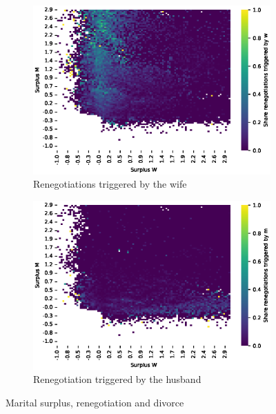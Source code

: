 \documentclass[]{article}
\begin{document}
\begin{figure}[H]
\begin{subfigure}{0.49\textwidth}
		\includegraphics[width=\textwidth]{surp_renw.eps} %
		\caption{Renegotiations triggered by the wife}
		\label{fig:picture3}
	\end{subfigure}
	\begin{subfigure}{0.49\textwidth}
		\centering
		\includegraphics[width=\textwidth]{surp_renm.eps} %
		\caption{Renegotiation triggered by the husband}
		\label{fig:picture3}
	\end{subfigure}
	
	\caption{Marital surplus, renegotiation and divorce}
	\label{fig:surp_ren}
\end{figure}
\end{document}
